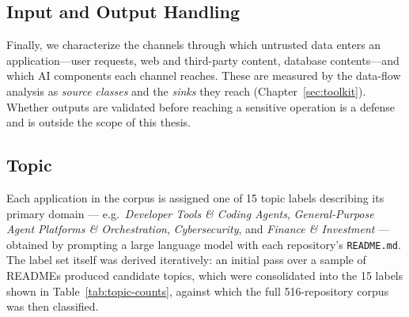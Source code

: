 \subsection{Input and Output Handling}

Finally, we characterize the channels through which untrusted data enters an application---user requests, web and third-party content, database contents---and which AI components each channel reaches. These are measured by the data-flow analysis as \emph{source classes} and the \emph{sinks} they reach (Chapter~\ref{sec:toolkit}). Whether outputs are validated before reaching a sensitive operation is a defense and is outside the scope of this thesis.

\subsection{Topic}
\label{sec:application-topic}




Each application in the corpus is assigned one of 15 topic labels
describing its primary domain --- e.g.\ \emph{Developer Tools \& Coding
Agents}, \emph{General-Purpose Agent Platforms \& Orchestration},
\emph{Cybersecurity}, and \emph{Finance \& Investment} --- obtained by
prompting a large language model with each repository's \texttt{README.md}.
The label set itself was derived iteratively: an initial pass over a
sample of READMEs produced candidate topics, which were consolidated into
the 15 labels shown in Table~\ref{tab:topic-counts}, against which the full
516-repository corpus was then classified.

